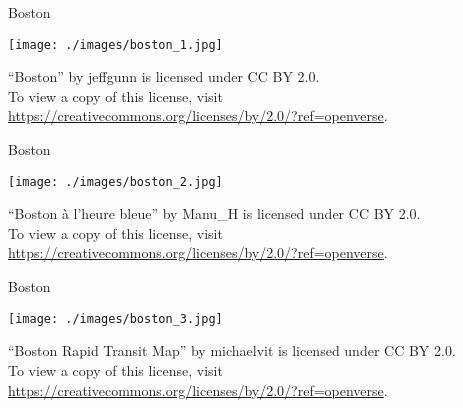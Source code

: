 \documentclass[aspectratio=169,xcolor={dvipsnames,table}]{beamer}
\begin{document}
\begin{frame}[plain]{Boston}

\raggedleft

\texttt{[image: ./images/boston\_1.jpg]}

\vspace*{-8pt}
\tiny

``Boston'' by jeffgunn is licensed under CC BY 2.0. \\
To view a copy of this license, visit \url{https://creativecommons.org/licenses/by/2.0/?ref=openverse}.
  \end{frame}

\begin{frame}[plain]{Boston}

\raggedleft

\texttt{[image: ./images/boston\_2.jpg]}

\vspace*{-8pt}
\tiny


``Boston \`{a} l'heure bleue'' by Manu\_H is licensed under CC BY 2.0.\\
To view a copy of this license, visit \url{https://creativecommons.org/licenses/by/2.0/?ref=openverse}.

 \end{frame}


\begin{frame}[plain]{Boston}

\raggedleft

\texttt{[image: ./images/boston\_3.jpg]}

\vspace*{-8pt}
\tiny


``Boston Rapid Transit Map'' by michaelvit is licensed under CC BY 2.0.\\
 To view a copy of this license, visit \url{https://creativecommons.org/licenses/by/2.0/?ref=openverse}.
 \end{frame}
\end{document}
